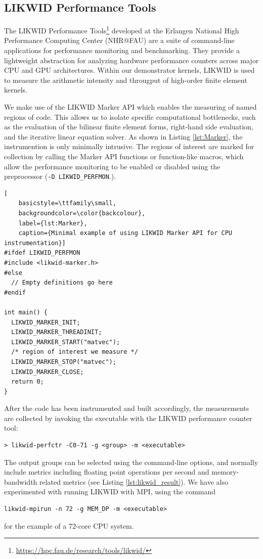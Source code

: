 \documentclass[a4paper,12pt]{article}
\begin{document}
\subsection{LIKWID Performance Tools}

The LIKWID Performance Tools\footnote{\url{https://hpc.fau.de/research/tools/likwid/}}
developed at the Erlangen National High Performance Computing Center (NHR@FAU) are a suite
of command-line applications for performance monitoring and benchmarking.
They provide a lightweight abstraction for analyzing hardware performance counters
across major CPU and GPU architectures. Within our demonstrator kernels, LIKWID
is used to measure the arithmetic intensity and througput of high-order
finite element kernels.

We make use of the LIKWID Marker API which enables the measuring of named regions of code.
This allows us to isolate specific computational bottlenecks, such as the evaluation
of the bilinear finite element forms, right-hand side evaluation, and the iterative linear
equation solver. As shown in Listing \ref{lst:Marker}, the instrumention is only minimally
intrusive. The regions of interest are marked for collection by calling the Marker API
functions or function-like macros, which allow the performance monitoring to be enabled
or disabled using the preprocessor (\texttt{-D LIKWID\_PERFMON}.).

\pagebreak
\begin{lstlisting}[
    basicstyle=\ttfamily\small,
    backgroundcolor=\color{backcolour},
    label={lst:Marker},
    caption={Minimal example of using LIKWID Marker API for CPU instrumentation}]
#ifdef LIKWID_PERFMON
#include <likwid-marker.h>
#else
  // Empty definitions go here
#endif

int main() {
  LIKWID_MARKER_INIT;
  LIKWID_MARKER_THREADINIT;
  LIKWID_MARKER_START("matvec");
  /* region of interest we measure */
  LIKWID_MARKER_STOP("matvec");
  LIKWID_MARKER_CLOSE;
  return 0;
}
\end{lstlisting}

After the code has been instrumented and built accordingly, the measurements are
collected by invoking the executable with the LIKWID performance counter tool:
\begin{verbatim}
> likwid-perfctr -C0-71 -g <group> -m <executable>
\end{verbatim}
The output groups can be selected using the command-line options, and normally include
metrics including floating point operations per second and memory-bandwidth related metrics
(see Listing \ref{lst:likwid_result}).
We have also experimented with running LIKWID with MPI, using the command
\begin{verbatim}
likwid-mpirun -n 72 -g MEM_DP -m <executable>
\end{verbatim}
for the example of a 72-core CPU system.
\end{document}
